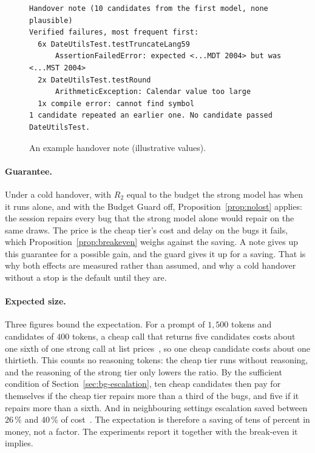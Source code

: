 \begin{figure}[htbp]
\centering
\begin{minipage}{0.95\textwidth}
\begin{Verbatim}[frame=single,rulecolor=\color{boxline},fontsize=\footnotesize,framesep=2mm]
Handover note (10 candidates from the first model, none plausible)
Verified failures, most frequent first:
  6x DateUtilsTest.testTruncateLang59
      AssertionFailedError: expected <...MDT 2004> but was <...MST 2004>
  2x DateUtilsTest.testRound
      ArithmeticException: Calendar value too large
  1x compile error: cannot find symbol
1 candidate repeated an earlier one. No candidate passed DateUtilsTest.
\end{Verbatim}
\end{minipage}
\caption{An example handover note (illustrative values).}
\label{fig:sys-note}
\end{figure}

\paragraph{Guarantee.} Under a cold handover, with $R_2$ equal to the budget
the strong model has when it runs alone, and with the Budget Guard off,
Proposition~\ref{prop:nolost} applies: the session repairs every bug that the
strong model alone would repair on the same draws. The price is the cheap
tier's cost and delay on the bugs it fails, which
Proposition~\ref{prop:breakeven} weighs against the saving. A note gives up
this guarantee for a possible gain, and the guard gives it up for a saving.
That is why both effects are measured rather than assumed, and why a cold
handover without a stop is the default until they are.

\paragraph{Expected size.} Three figures bound the expectation. For a prompt
of $1{,}500$ tokens and candidates of $400$ tokens, a cheap call that returns
five candidates costs about one sixth of one strong call at list
prices~\citep{aibusiness2026gpt6}, so one cheap candidate costs about one
thirtieth. This counts no reasoning tokens: the cheap tier runs without
reasoning, and the reasoning of the strong tier only lowers the ratio. By the
sufficient condition of Section~\ref{sec:bg-escalation}, ten
cheap candidates then pay for themselves if the cheap tier repairs more than a
third of the bugs, and five if it repairs more than a sixth. And in
neighbouring settings escalation saved between $26\,\%$ and $40\,\%$ of
cost~\citep{chen2024cascading,gandhi2025strongweak}. The expectation is
therefore a saving of tens of percent in money, not a factor. The experiments
report it together with the break-even it implies.

